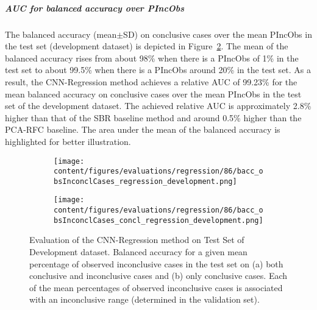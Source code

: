 \subparagraph{AUC for balanced accuracy over PIncObs}

The balanced accuracy (mean$\pm$SD) on conclusive cases over the mean PIncObs in the test set (development dataset) 
is depicted in Figure~\ref{fig:bacc_obsInconclCases_concl_regression_development}.
The mean of the balanced accuracy rises from about 98\% when there is a PIncObs of 1\% in the test set 
to about 99.5\% when there is a PIncObs around 20\% in the test set.
As a result, the CNN-Regression method achieves a relative AUC of 99.23\% for the mean balanced accuracy on conclusive cases
over the mean PIncObs in the test set of the development dataset.
The achieved relative AUC is approximately 2.8\% higher than that of the SBR baseline method 
and around 0.5\% higher than the PCA-RFC baseline.
The area under the mean of the balanced accuracy is highlighted for better illustration.


\begin{figure}[ht]
  \begin{subfigure}{0.9\textwidth}
    \centering
    \texttt{[image: content/figures/evaluations/regression/86/bacc\_obsInconclCases\_regression\_development.png]}
    \subcaption{}
    \label{fig:bacc_obsInconclCases_regression_development}
  \end{subfigure}
  \hfill
  \begin{subfigure}{0.9\textwidth}
    \centering
    \texttt{[image: content/figures/evaluations/regression/86/bacc\_obsInconclCases\_concl\_regression\_development.png]}
    \subcaption{}
    \label{fig:bacc_obsInconclCases_concl_regression_development}
  \end{subfigure}

  \caption{Evaluation of the CNN-Regression method on Test Set of Development dataset.
  Balanced accuracy for a given mean percentage of observed inconclusive cases in the test set on 
  (a) both conclusive and inconclusive cases and (b) only conclusive cases. 
  Each of the mean percentages of observed inconclusive cases is associated with an inconclusive range (determined in the validation set). }
  \label{fig:bacc_obsInconclCases_regression_development_full}
\end{figure}



